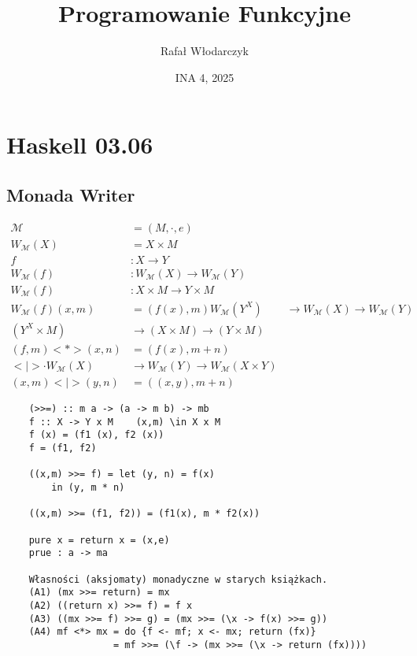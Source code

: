 \documentclass{article}
\title{Programowanie Funkcyjne}
\author{Rafał Włodarczyk}
\date{INA 4, 2025}
\begin{document}
\maketitle

\tableofcontents

\section{Haskell 03.06}

\subsection{Monada Writer}

\begin{align}
    \mathcal{M} &= (M,\cdot, e)\\
    W_{\mathcal{M}} (X) &= X \times M\\
    f &: X \rightarrow Y \\
    W_{\mathcal{M}} (f) &: W_{\mathcal{M}} (X) \rightarrow W_{\mathcal{M}} (Y)\\
    W_{\mathcal{M}} (f) &: X \times M \rightarrow Y \times M\\
    W_{\mathcal{M}} (f) (x, m) &= (f(x), m)
    W_{\mathcal{M}} (Y^X) &\rightarrow W_{\mathcal{M}} (X) \rightarrow W_{\mathcal{M}} (Y)\\
    (Y^X \times M) &\rightarrow (X \times M) \rightarrow (Y \times M)\\
    (f,m) <*> (x,n) &= (f(x), m + n)\\
    <|> \cdot W_{\mathcal{M}} (X) &\rightarrow W_{\mathcal{M}} (Y) \rightarrow W_{\mathcal{M}} (X \times Y)\\
    (x,m) <|> (y,n) &= ((x,y), m + n)
\end{align}

\begin{verbatim}
    (>>=) :: m a -> (a -> m b) -> mb
    f :: X -> Y x M    (x,m) \in X x M
    f (x) = (f1 (x), f2 (x))
    f = (f1, f2)

    ((x,m) >>= f) = let (y, n) = f(x)
        in (y, m * n)

    ((x,m) >>= (f1, f2)) = (f1(x), m * f2(x))

    pure x = return x = (x,e)
    prue : a -> ma

    Własności (aksjomaty) monadyczne w starych książkach.
    (A1) (mx >>= return) = mx
    (A2) ((return x) >>= f) = f x
    (A3) ((mx >>= f) >>= g) = (mx >>= (\x -> f(x) >>= g))
    (A4) mf <*> mx = do {f <- mf; x <- mx; return (fx)} 
                   = mf >>= (\f -> (mx >>= (\x -> return (fx))))
\end{verbatim}
\end{document}
